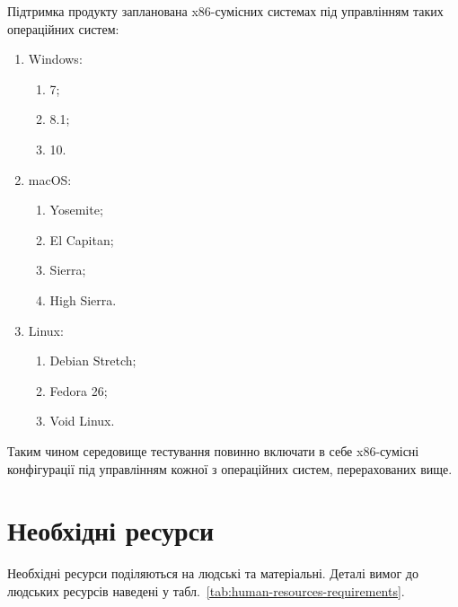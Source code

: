 \documentclass[a4paper,oneside,DIV=12,12pt]{scrartcl}
\begin{document}
		Підтримка продукту запланована x86-сумісних системах під управлінням таких операційних систем:
		\begin{enumerate}
			\item Windows:
				\begin{enumerate}
					\item 7;
					\item 8.1;
					\item 10.
				\end{enumerate}
			\item macOS:
				\begin{enumerate}
					\item Yosemite;
					\item El Capitan;
					\item Sierra;
					\item High Sierra.
				\end{enumerate}
			\item Linux:
				\begin{enumerate}
					\item Debian Stretch;
					\item Fedora 26;
					\item Void Linux.
				\end{enumerate}
		\end{enumerate}
		
		Таким чином середовище тестування повинно включати в себе x86-сумісні конфігурації під управлінням кожної з операційних систем, перерахованих вище.
		
    \section{Необхідні ресурси}
		\label{sec:resourcesreq}
		
		Необхідні ресурси поділяються на людські та матеріальні. Деталі вимог до людських ресурсів наведені у табл.~\ref{tab:human-resources-requirements}.
		
\end{document}
